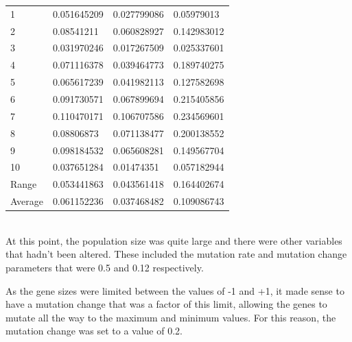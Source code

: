 \documentclass[sigconf]{acmart}
\begin{document}
%
%
\begin{supertabular}{p{0.1\columnwidth}p{0.25\columnwidth}p{0.25\columnwidth}p{0.25\columnwidth}}
    1&0.051645209&0.027799086&0.05979013\\
    2&0.08541211&0.060828927&0.142983012\\
    3&0.031970246&0.017267509&0.025337601\\
    4&0.071116378&0.039464773&0.189740275\\
    5&0.065617239&0.041982113&0.127582698\\
    6&0.091730571&0.067899694&0.215405856\\
    7&0.110470171&0.106707586&0.234569601\\
    8&0.08806873&0.071138477&0.200138552\\
    9&0.098184532&0.065608281&0.149567704\\
    10&0.037651284&0.01474351&0.057182944\\
    Range&0.053441863&0.043561418&0.164402674\\
    Average&0.061152236&0.037468482&0.109086743\\
    
\end{supertabular}%
\\

At this point, the population size was quite large and there were other variables that hadn't been altered. These included the mutation rate and mutation change parameters that were 0.5 and 0.12 respectively.

As the gene sizes were limited between the values of -1 and +1, it made sense to have a mutation change that was a factor of this limit, allowing the genes to mutate all the way to the maximum and minimum values. For this reason, the mutation change was set to a value of 0.2.
\end{document}
